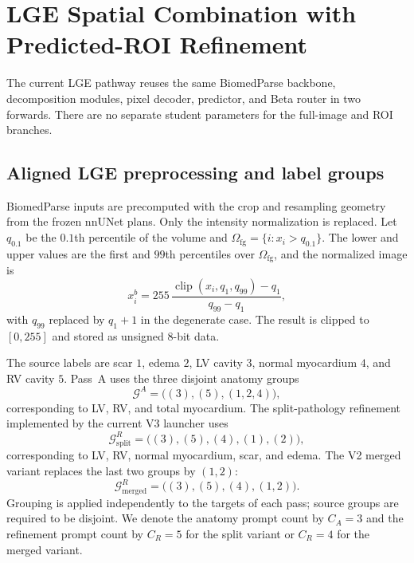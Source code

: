 \documentclass[10pt]{article}
\newcommand{\clip}{\operatorname{clip}}
\begin{document}
\section{LGE Spatial Combination with Predicted-ROI Refinement}


The current LGE pathway reuses the same BiomedParse backbone, decomposition
modules, pixel decoder, predictor, and Beta router in two forwards.  There are no
separate student parameters for the full-image and ROI branches.

\subsection{Aligned LGE preprocessing and label groups}

BiomedParse inputs are precomputed with the crop and resampling geometry from
the frozen nnUNet plans.  Only the intensity normalization is replaced.  Let
$q_{0.1}$ be the $0.1$th percentile of the volume and
$\Omega_{\mathrm{fg}}=\{i:x_i>q_{0.1}\}$.  The lower and upper values are the
first and $99$th percentiles over $\Omega_{\mathrm{fg}}$, and the normalized
image is
\begin{equation}
    x_i^{b}=255\,
      \frac{\clip(x_i,q_1,q_{99})-q_1}{q_{99}-q_1},
    \label{eq:mri-normalization}
\end{equation}
with $q_{99}$ replaced by $q_1+1$ in the degenerate case.  The result is clipped
to $[0,255]$ and stored as unsigned 8-bit data.

The source labels are scar $1$, edema $2$, LV cavity $3$, normal myocardium $4$,
and RV cavity $5$.  Pass~A uses the three disjoint anatomy groups
\begin{equation}
    \mathcal{G}^{A}=\bigl((3),(5),(1,2,4)\bigr),
    \label{eq:anatomy-groups}
\end{equation}
corresponding to LV, RV, and total myocardium.  The split-pathology refinement
implemented by the current V3 launcher uses
\begin{equation}
    \mathcal{G}^{R}_{\mathrm{split}}
    =\bigl((3),(5),(4),(1),(2)\bigr),
    \label{eq:split-groups}
\end{equation}
corresponding to LV, RV, normal myocardium, scar, and edema.  The V2 merged
variant replaces the last two groups by $(1,2)$:
\begin{equation}
    \mathcal{G}^{R}_{\mathrm{merged}}
    =\bigl((3),(5),(4),(1,2)\bigr).
    \label{eq:merged-groups}
\end{equation}
Grouping is applied independently to the targets of each pass; source groups are
required to be disjoint.  We denote the anatomy prompt count by $C_A=3$ and the
refinement prompt count by $C_R=5$ for the split variant or $C_R=4$ for the
merged variant.
\end{document}
